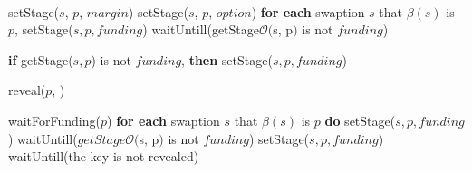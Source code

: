 \begin{enumerate}
\begin{algorithm} [H]                    
\begin{algorithmic}                  %

    
    \vspace{-1.2em}
    \\
    \EndFunction
    
    \vspace{-1.2em}
    \State {} 
        \State \Return setStage($s$, $p$, $margin$)
        \State \Return setStage($s$, $p$, $option$)
    \EndIf
    \EndFor
    \EndFunction
        \State \textbf{for each} swaption $s$ that $\beta(s)$ is $p$, setStage($s, p, funding$) 
        \State waitUntill(getStage$\mathcal{O}($s, p$)$ is not $funding$)
        
        \State \textbf{if} getStage($s, p$) is not $funding$, \textbf{then} setStage($s, p, funding$)
        \EndFor
        
        \State reveal($p$, \Aone)
    \Else
        
        \State waitForFunding($p$)
        \State \textbf{for each} swaption $s$ that $\beta(s)$ is $p$ \textbf{do} setStage($s, p, funding$)
        \State waitUntill($getStage\mathcal{O}($s, p$)$ is not $funding$)
        \State setStage($s, p, funding$)
        \EndFor
        \State waitUntill(the \Aone key is not revealed)
        

\end{algorithmic}
\end{algorithm}
\end{enumerate}
